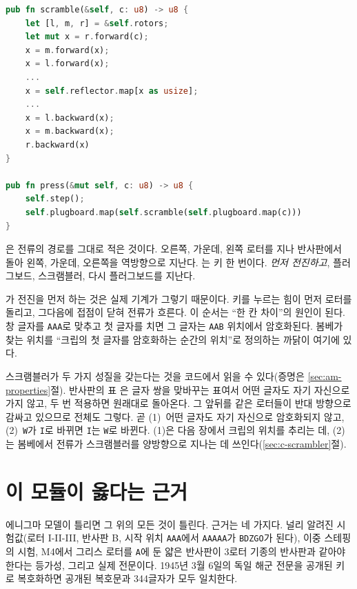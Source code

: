 \begin{lstlisting}[language=Rust,caption={\code{enigma.rs}: 스크램블러와 키 한 번(그리스 로터 부분 생략).},label={lst:press}]
pub fn scramble(&self, c: u8) -> u8 {
    let [l, m, r] = &self.rotors;
    let mut x = r.forward(c);
    x = m.forward(x);
    x = l.forward(x);
    ...
    x = self.reflector.map[x as usize];
    ...
    x = l.backward(x);
    x = m.backward(x);
    r.backward(x)
}

pub fn press(&mut self, c: u8) -> u8 {
    self.step();
    self.plugboard.map(self.scramble(self.plugboard.map(c)))
}
\end{lstlisting}

은 전류의 경로를 그대로 적은 것이다. 오른쪽, 가운데, 왼쪽 로터를 지나 반사판에서 돌아
왼쪽, 가운데, 오른쪽을 역방향으로 지난다. 는 키 한 번이다. \emph{먼저 전진하고}, 플러그보드,
스크램블러, 다시 플러그보드를 지난다.

\Why {}가 전진을 먼저 하는 것은 실제 기계가 그렇기 때문이다. 키를 누르는 힘이 먼저 로터를 돌리고,
그다음에 접점이 닫혀 전류가 흐른다. 이 순서는 ``한 칸 차이''의 원인이 된다. 창 글자를 \texttt{AAA}로 맞추고
첫 글자를 치면 그 글자는 \texttt{AAB} 위치에서 암호화된다. 봄베가 찾는 위치를 ``크립의 첫 글자를 암호화하는
순간의 위치''로 정의하는 까닭이 여기에 있다.

스크램블러가 두 가지 성질을 갖는다는 것을 코드에서 읽을 수 있다(증명은 \ref{sec:am-properties}절). 반사판의 표 은 글자
쌍을 맞바꾸는 표여서 어떤 글자도 자기 자신으로 가지 않고, 두 번 적용하면 원래대로 돌아온다. 그 앞뒤를 같은
로터들이 반대 방향으로 감싸고 있으므로  전체도 그렇다. 곧 (1)~어떤 글자도 자기 자신으로
암호화되지 않고, (2)~\texttt{W}가 \texttt{I}로 바뀌면 \texttt{I}는 \texttt{W}로 바뀐다. (1)은 다음 장에서
크립의 위치를 추리는 데, (2)는 봄베에서 전류가 스크램블러를 양방향으로 지나는 데 쓰인다(\ref{sec:c-scrambler}절).

\section{이 모듈이 옳다는 근거}

에니그마 모델이 틀리면 그 위의 모든 것이 틀린다. 근거는 네 가지다. 널리 알려진 시험값(로터 I-II-III,
반사판 B, 시작 위치 \texttt{AAA}에서 \texttt{AAAAA}가 \texttt{BDZGO}가 된다), 이중 스테핑의 시험, M4에서
그리스 로터를 \texttt{A}에 둔 얇은 반사판이 3로터 기종의 반사판과 같아야 한다는 등가성, 그리고 실제 전문이다.
1945년 3월 6일의 독일 해군 전문을 공개된 키로 복호화하면 공개된 복호문과 344글자가 모두 일치한다.

